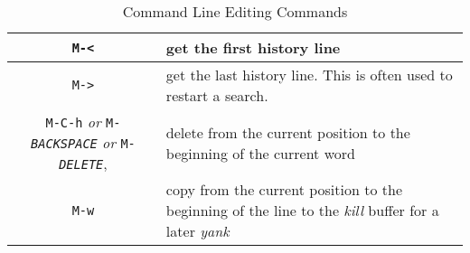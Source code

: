 \begin{table}[tbh]
\begin{center}
\begin{tabular}{|c|p{3.0in}|}
{\tt M-\verb-<-}	& get the first history line \\ \hline
{\tt M-\verb->-}	& get the last history line. This is 
			often used to restart a search.\\ \hline
{\tt M-C-h} {\em or} {\tt M-{\em BACKSPACE}} {\em or} {\tt M-{\em DELETE}}, 	& 
			delete from the current position to the beginning
			of the current word \\ \hline
{\tt M-w}	& copy from the current position to the beginning 
			of the line to the {\em kill} buffer for a later {\em yank} \\
\hline
\end{tabular}
\end{center}
\caption{ Command Line Editing Commands }
\label{editline-table}
\end{table}

